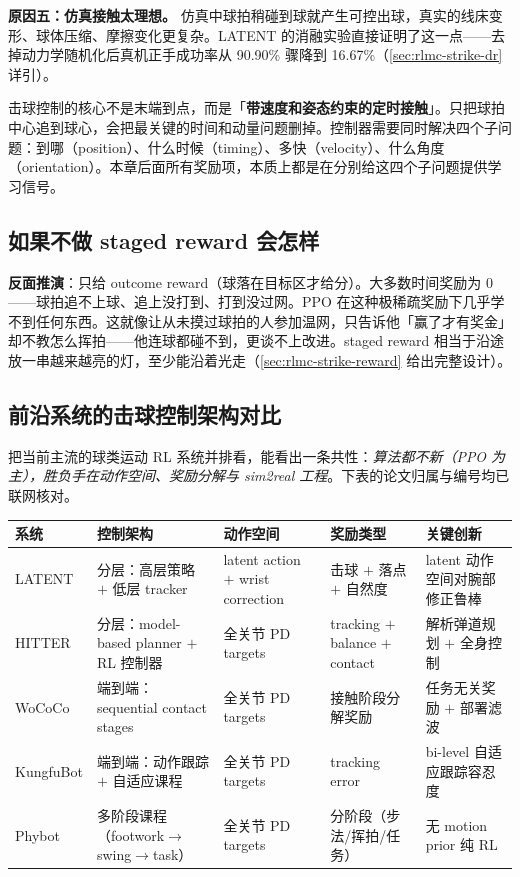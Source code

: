 \textbf{原因五：仿真接触太理想。} 仿真中球拍稍碰到球就产生可控出球，真实的线床变形、球体压缩、摩擦变化更复杂。LATENT 的消融实验直接证明了这一点——去掉动力学随机化后真机正手成功率从 90.90\% 骤降到 16.67\%（\cref{sec:rlmc-strike-dr} 详引）。

\begin{insight}\label{ins:rlmc-strike-timed-contact}
击球控制的核心不是末端到点，而是「\textbf{带速度和姿态约束的定时接触}」。只把球拍中心追到球心，会把最关键的时间和动量问题删掉。控制器需要同时解决四个子问题：到哪（position）、什么时候（timing）、多快（velocity）、什么角度（orientation）。本章后面所有奖励项，本质上都是在分别给这四个子问题提供学习信号。
\end{insight}

\subsection{如果不做 staged reward 会怎样}

\textbf{反面推演}：只给 outcome reward（球落在目标区才给分）。大多数时间奖励为 0——球拍追不上球、追上没打到、打到没过网。PPO 在这种极稀疏奖励下几乎学不到任何东西。这就像让从未摸过球拍的人参加温网，只告诉他「赢了才有奖金」却不教怎么挥拍——他连球都碰不到，更谈不上改进。staged reward 相当于沿途放一串越来越亮的灯，至少能沿着光走（\cref{sec:rlmc-strike-reward} 给出完整设计）。

\subsection{前沿系统的击球控制架构对比}

把当前主流的球类运动 RL 系统并排看，能看出一条共性：\emph{算法都不新（PPO 为主），胜负手在动作空间、奖励分解与 sim2real 工程}。下表的论文归属与编号均已联网核对。

\begin{center}
\small
\begin{tabular}{@{}lllll@{}}
\toprule
系统 & 控制架构 & 动作空间 & 奖励类型 & 关键创新 \\
\midrule
LATENT & 分层：高层策略 $+$ 低层 tracker & latent action $+$ wrist correction & 击球 $+$ 落点 $+$ 自然度 & latent 动作空间对腕部修正鲁棒 \\
HITTER & 分层：model-based planner $+$ RL 控制器 & 全关节 PD targets & tracking $+$ balance $+$ contact & 解析弹道规划 $+$ 全身控制 \\
WoCoCo & 端到端：sequential contact stages & 全关节 PD targets & 接触阶段分解奖励 & 任务无关奖励 $+$ 部署滤波 \\
KungfuBot & 端到端：动作跟踪 $+$ 自适应课程 & 全关节 PD targets & tracking error & bi-level 自适应跟踪容忍度 \\
Phybot & 多阶段课程（footwork$\to$swing$\to$task） & 全关节 PD targets & 分阶段（步法/挥拍/任务） & 无 motion prior 纯 RL \\
\bottomrule
\end{tabular}
\end{center}

